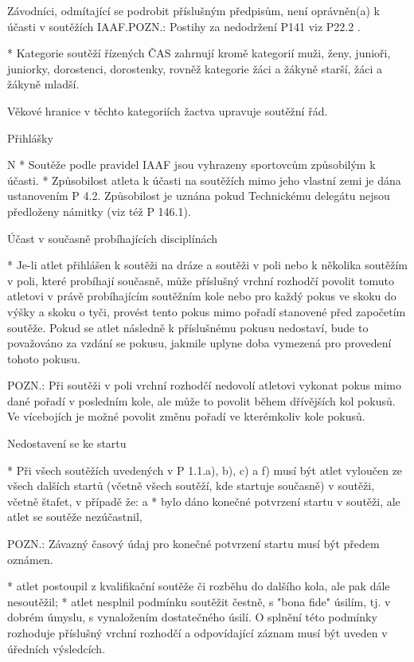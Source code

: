   Závodníci, odmítající se podrobit příslušným předpisům, není oprávněn(a) k účasti v soutěžích IAAF.POZN.: Postihy za nedodržení P141 viz P22.2 .

* Kategorie soutěží řízených ČAS zahrnují kromě kategorií muži, ženy, junioři, juniorky, dorostenci, dorostenky, rovněž kategorie žáci a žákyně starší, žáci a žákyně mladší.

Věkové hranice v těchto kategoriích žactva upravuje soutěžní řád.

\secc Přihlášky

\begitems \style N
* Soutěže podle pravidel IAAF jsou vyhrazeny sportovcům způsobilým k účasti.
* Způsobilost atleta k účasti na soutěžích mimo jeho vlastní zemi je dána ustanovením P 4.2. Způsobilost je uznána pokud Technickému delegátu nejsou předloženy námitky (viz též P 146.1).

Účast v současně probíhajících disciplínách

* Je-li atlet přihlášen k soutěži na dráze a soutěži v poli nebo k několika soutěžím v poli, které probíhají současně, může příslušný vrchní rozhodčí povolit tomuto atletovi v právě probíhajícím soutěžním kole nebo pro každý pokus ve skoku do výšky a skoku o tyči, provést tento pokus mimo pořadí stanovené před započetím soutěže. Pokud se atlet následně k příslušnému pokusu nedostaví, bude to považováno za vzdání se pokusu, jakmile uplyne doba vymezená pro provedení tohoto pokusu.

POZN.: Při soutěži v poli vrchní rozhodčí nedovolí atletovi vykonat pokus mimo dané pořadí v posledním kole, ale může to povolit během dřívějších kol pokusů. Ve vícebojích je možné povolit změnu pořadí ve kterémkoliv kole pokusů.

Nedostavení se ke startu

* Při všech soutěžích uvedených v P 1.1.a), b), c) a f) musí být atlet vyloučen ze všech dalších startů (včetně všech soutěží, kde startuje současně) v soutěži, včetně štafet, v případě že:
  \begitems \style a
  * bylo dáno konečné potvrzení startu v soutěži, ale atlet se soutěže nezúčastnil,

  POZN.: Závazný časový údaj pro konečné potvrzení startu musí být předem oznámen.

  * atlet postoupil z kvalifikační soutěže či rozběhu do dalšího kola, ale pak dále nesoutěžil;
  * atlet nesplnil podmínku soutěžit čestně, s "bona fide" úsilím, tj. v dobrém úmyslu, s vynaložením dostatečného úsilí. O splnění této podmínky rozhoduje příslušný vrchní rozhodčí a odpovídající záznam musí být uveden v úředních výsledcích.

